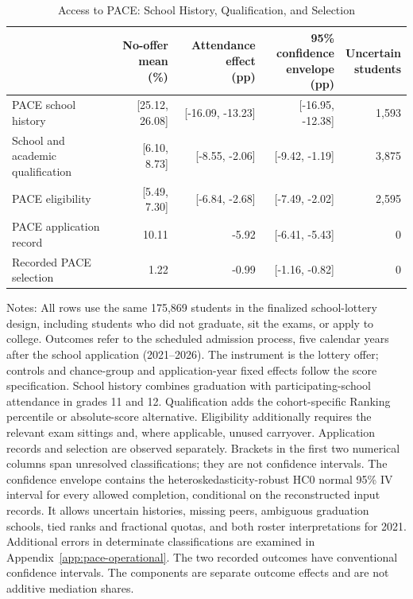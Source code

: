 \begin{table}[!htbp]
\centering
\caption{Access to PACE: School History, Qualification, and Selection}
\label{tab:pace-operational}
\small
\setlength{\tabcolsep}{3pt}
\begin{tabular}{p{3.9cm}rrrr}
\toprule
 & \makecell{No-offer mean\\(\%)} & \makecell{Attendance effect\\(pp)} & \makecell{95\% confidence\\envelope (pp)} & \makecell{Uncertain\\students} \\
\midrule
PACE school history & [25.12, 26.08] & [-16.09, -13.23] & [-16.95, -12.38] & 1,593 \\[4pt]
School and academic qualification & [6.10, 8.73] & [-8.55, -2.06] & [-9.42, -1.19] & 3,875 \\[4pt]
PACE eligibility & [5.49, 7.30] & [-6.84, -2.68] & [-7.49, -2.02] & 2,595 \\[4pt]
PACE application record & 10.11 & -5.92 & [-6.41, -5.43] & 0 \\[4pt]
Recorded PACE selection & 1.22 & -0.99 & [-1.16, -0.82] & 0 \\[4pt]
\bottomrule
\end{tabular}
\par\vspace{0.2cm}
\begin{minipage}{\textwidth}\footnotesize
Notes: All rows use the same 175,869 students in the finalized school-lottery design, including students who did not graduate, sit the exams, or apply to college. Outcomes refer to the scheduled admission process, five calendar years after the school application (2021--2026). The instrument is the lottery offer; controls and chance-group and application-year fixed effects follow the score specification. School history combines graduation with participating-school attendance in grades 11 and 12. Qualification adds the cohort-specific Ranking percentile or absolute-score alternative. Eligibility additionally requires the relevant exam sittings and, where applicable, unused carryover. Application records and selection are observed separately. Brackets in the first two numerical columns span unresolved classifications; they are not confidence intervals. The confidence envelope contains the heteroskedasticity-robust HC0 normal 95\% IV interval for every allowed completion, conditional on the reconstructed input records. It allows uncertain histories, missing peers, ambiguous graduation schools, tied ranks and fractional quotas, and both roster interpretations for 2021. Additional errors in determinate classifications are examined in Appendix~\ref{app:pace-operational}. The two recorded outcomes have conventional confidence intervals. The components are separate outcome effects and are not additive mediation shares.
\end{minipage}
\end{table}
